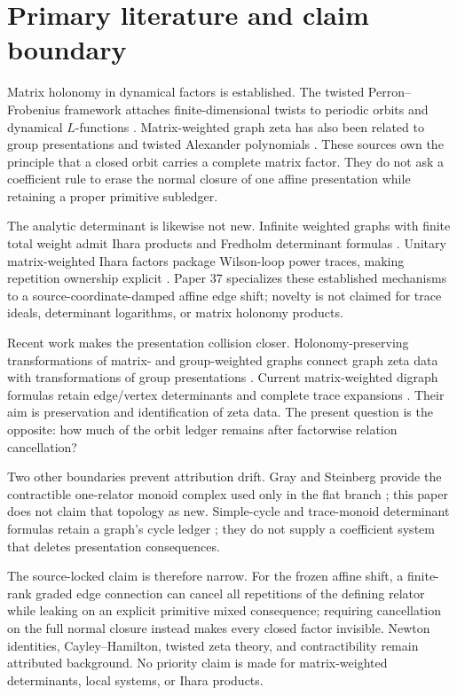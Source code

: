 \section{Primary literature and claim boundary}
\label{sec:literature}

Matrix holonomy in dynamical factors is established.  The twisted
Perron--Frobenius framework attaches finite-dimensional twists to periodic
orbits and dynamical $L$-functions \citep{AdachiSunada1987}.  Matrix-weighted
graph zeta has also been related to group presentations and twisted Alexander
polynomials \citep{Goda2020}.  These sources own the principle that a closed
orbit carries a complete matrix factor.  They do not ask a coefficient rule
to erase the normal closure of one affine presentation while retaining a
proper primitive subledger.

The analytic determinant is likewise not new.  Infinite weighted graphs with
finite total weight admit Ihara products and Fredholm determinant formulas
\citep{Deitmar2015}.  Unitary matrix-weighted Ihara factors package Wilson-loop
power traces, making repetition ownership explicit
\citep{MatsuuraOhta2024}.  Paper 37 specializes these established mechanisms
to a source-coordinate-damped affine edge shift; novelty is not claimed for
trace ideals, determinant logarithms, or matrix holonomy products.

Recent work makes the presentation collision closer.  Holonomy-preserving
transformations of matrix- and group-weighted graphs connect graph zeta data
with transformations of group presentations \citep{Nagasaka2025}.  Current
matrix-weighted digraph formulas retain edge/vertex determinants and complete
trace expansions \citep{GodaMorifuji2026}.  Their aim is preservation and
identification of zeta data.  The present question is the opposite: how much
of the orbit ledger remains after factorwise relation cancellation?

Two other boundaries prevent attribution drift.  Gray and Steinberg provide
the contractible one-relator monoid complex used only in the flat branch
\citep{GraySteinberg2022}; this paper does not claim that topology as new.
Simple-cycle and trace-monoid determinant formulas retain a graph's cycle
ledger \citep{Watanabe2026}; they do not supply a coefficient system that
deletes presentation consequences.

The source-locked claim is therefore narrow.  For the frozen affine shift, a
finite-rank graded edge connection can cancel all repetitions of the defining
relator while leaking on an explicit primitive mixed consequence; requiring
cancellation on the full normal closure instead makes every closed factor
invisible.  Newton identities, Cayley--Hamilton, twisted zeta theory, and
contractibility remain attributed background.  No priority claim is made for
matrix-weighted determinants, local systems, or Ihara products.
